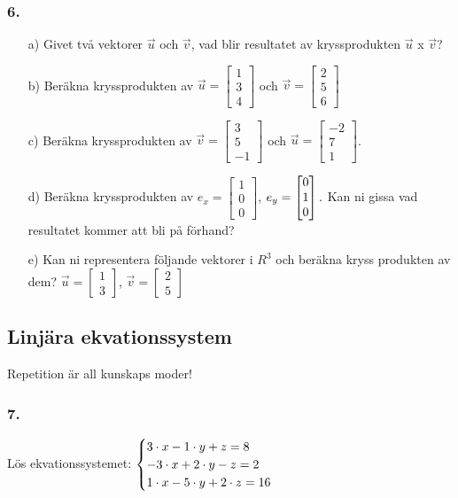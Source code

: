 \documentclass{article}
\begin{document}
\subsubsection*{6.}
\begin{itemize}
	\item[a) ] Givet två vektorer $\vec{u}$ och $\vec{v}$, vad blir resultatet av kryssprodukten $\vec{u}$ x $\vec{v}$?
	\item[b) ] Beräkna kryssprodukten av $\vec{u} = \begin{bmatrix} 1 \\ 3 \\ 4\end{bmatrix}$ och $\vec{v} = \begin{bmatrix} 2 \\ 5 \\ 6\end{bmatrix}$
	\item[c) ] Beräkna kryssprodukten av $\vec{v} = \begin{bmatrix} 3 \\ 5 \\ -1 \end{bmatrix}$ och $\vec{u} = \begin{bmatrix} -2 \\ 7 \\ 1 \end{bmatrix}$. 
	\item[d) ] Beräkna kryssprodukten av $e_x = \begin{bmatrix} 1 \\ 0 \\ 0 \end{bmatrix}$, $e_y = \begin{bmatrix} 0 \\ 1 \\ 0 \end{bmatrix}.\\ \\ $ Kan ni gissa vad resultatet kommer att bli på förhand?
	\item[e) ] Kan ni representera följande vektorer i $R^3$ och beräkna kryss produkten av dem? $\vec{u} = \begin{bmatrix} 1 \\ 3 \end{bmatrix}$, $\vec{v} = \begin{bmatrix} 2 \\ 5 \end{bmatrix}$
\end{itemize}

\subsection*{Linjära ekvationssystem}
Repetition är all kunskaps moder!
\subsubsection*{7.}
Lös ekvationssystemet: 
\begin{math}
	\begin{cases}
	3 \cdot x - 1 \cdot y  + z = 8 \\
	-3 \cdot x + 2 \cdot y -z = 2 \\
	1 \cdot x - 5 \cdot y  + 2 \cdot z = 16 \\
	\end{cases}
	\\
	\\
\end{math}
\end{document}

